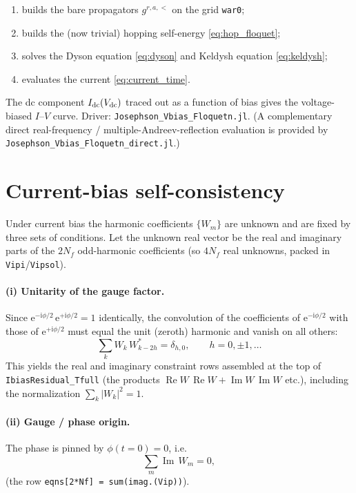 \documentclass[11pt,a4paper]{article}
\newcommand{\ii}{\mathrm{i}}
\newcommand{\ee}{\mathrm{e}}
\newcommand{\Real}{\operatorname{Re}}
\newcommand{\Imag}{\operatorname{Im}}
\newcommand{\Wm}{W}
\begin{document}
\begin{enumerate}
  \item builds the bare propagators $g^{r,a,<}$ on the grid \texttt{war0};
  \item builds the (now trivial) hopping self-energy \eqref{eq:hop_floquet};
  \item solves the Dyson equation \eqref{eq:dyson} and Keldysh equation
        \eqref{eq:keldysh};
  \item evaluates the current \eqref{eq:current_time}.
\end{enumerate}
The dc component $I_{\rm dc}(V_{\rm dc})$ traced out as a function of bias gives
the voltage-biased $I$--$V$ curve.  Driver:
\texttt{Josephson\_Vbias\_Floquetn.jl}.  (A complementary direct
real-frequency / multiple-Andreev-reflection evaluation is provided by
\texttt{Josephson\_Vbias\_Floquetn\_direct.jl}.)

\section{Current-bias self-consistency}
\label{sec:ibias}

Under current bias the harmonic coefficients $\{\Wm_m\}$ are unknown and are
fixed by three sets of conditions.  Let the unknown real vector be the real and
imaginary parts of the $2N_f$ odd-harmonic coefficients (so $4N_f$ real
unknowns, packed in \texttt{Vipi}/\texttt{Vipsol}).

\paragraph{(i) Unitarity of the gauge factor.}
Since $\ee^{-\ii\phi/2}\,\ee^{+\ii\phi/2}=1$ identically, the convolution of the
coefficients of $\ee^{-\ii\phi/2}$ with those of $\ee^{+\ii\phi/2}$ must equal
the unit (zeroth) harmonic and vanish on all others:
\begin{equation}
  \sum_{k}\Wm_{k}\,\Wm^{*}_{k-2h} = \delta_{h,0},
  \qquad h=0,\pm1,\dots
  \label{eq:unitarity}
\end{equation}
This yields the real and imaginary constraint rows assembled at the top of
\texttt{IbiasResidual\_Tfull} (the products $\Real\Wm\,\Real\Wm+\Imag\Wm\,\Imag\Wm$ etc.),
including the normalization $\sum_k|\Wm_k|^2=1$.

\paragraph{(ii) Gauge / phase origin.}
The phase is pinned by $\phi(t{=}0)=0$, i.e.
\begin{equation}
  \sum_m \Imag\,\Wm_m = 0,
  \label{eq:gauge_fix}
\end{equation}
(the row \texttt{eqns[2*Nf] = sum(imag.(Vip))}).
\end{document}
